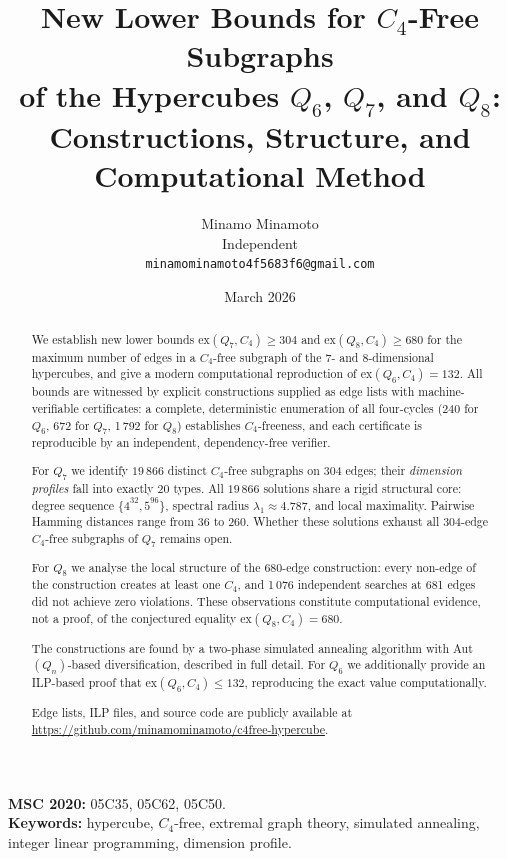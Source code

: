 \documentclass[12pt,a4paper]{article}
\title{\textbf{New Lower Bounds for $C_4$-Free Subgraphs\\
of the Hypercubes $Q_6$, $Q_7$, and $Q_8$:\\
Constructions, Structure, and Computational Method}}
\author{Minamo Minamoto\\[4pt]
\small Independent\\
\small \texttt{minamominamoto4f5683f6@gmail.com}}
\date{March 2026}
\theoremstyle{definition}
\newcommand{\ex}{\mathrm{ex}}
\begin{document}
\maketitle

\begin{abstract}
We establish new lower bounds $\ex(Q_7,C_4)\ge304$ and $\ex(Q_8,C_4)\ge680$
for the maximum number of edges in a $C_4$-free subgraph of the 7- and
8-dimensional hypercubes, and give a modern computational reproduction of
$\ex(Q_6,C_4)=132$.
All bounds are witnessed by explicit constructions supplied as edge lists with
machine-verifiable certificates: a complete, deterministic enumeration of all
four-cycles (240 for $Q_6$, 672 for $Q_7$, 1\,792 for $Q_8$) establishes
$C_4$-freeness, and each certificate is reproducible by an independent,
dependency-free verifier.

For $Q_7$ we identify $19\,866$ distinct $C_4$-free subgraphs on 304 edges;
their \emph{dimension profiles} fall into exactly 20 types.  All $19\,866$
solutions share a rigid structural core: degree sequence
$\{4^{32},5^{96}\}$, spectral radius $\lambda_1\approx4.787$, and local
maximality.  Pairwise Hamming distances range from 36 to 260.
Whether these solutions exhaust all 304-edge $C_4$-free subgraphs of
$Q_7$ remains open.

For $Q_8$ we analyse the local structure of the 680-edge construction:
every non-edge of the construction creates at least one $C_4$, and
1\,076 independent searches at 681 edges did not achieve zero violations.
These observations constitute computational evidence, not a proof,
of the conjectured equality $\ex(Q_8,C_4)=680$.

The constructions are found by a two-phase simulated annealing algorithm
with Aut$(Q_n)$-based diversification, described in full detail.
For $Q_6$ we additionally provide an ILP-based proof that
$\ex(Q_6,C_4)\le132$, reproducing the exact value computationally.

Edge lists, ILP files, and source code are publicly available at\\
\url{https://github.com/minamominamoto/c4free-hypercube}.
\end{abstract}

\medskip
\noindent\textbf{MSC 2020:} 05C35, 05C62, 05C50.\\
\textbf{Keywords:} hypercube, $C_4$-free, extremal graph theory,
simulated annealing, integer linear programming, dimension profile.

\tableofcontents
\end{document}

